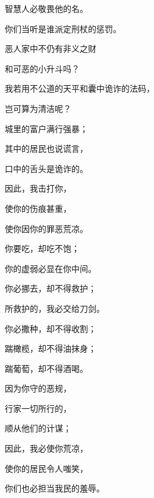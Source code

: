 {\par }{\Q 智慧人必敬畏他的名。
\par }{\Q 你们当听是谁派定刑杖的惩罚。
\par }{\Q {}恶人家中不仍有非义之财
\par }{\Q 和可恶的小升斗吗？
\par }{\Q {}我若用不公道的天平和囊中诡诈的法码，
\par }{\Q 岂可算为清洁呢？
\par }{\Q {}城里的富户满行强暴；
\par }{\Q 其中的居民也说谎言，
\par }{\Q 口中的舌头是诡诈的。
\par }{\Q {}因此，我击打你，
\par }{\Q 使你的伤痕甚重，
\par }{\Q 使你因你的罪恶荒凉。
\par }{\Q {}你要吃，却吃不饱；
\par }{\Q 你的虚弱必显在你中间。
\par }{\Q 你必挪去，却不得救护；
\par }{\Q 所救护的，我必交给刀剑。
\par }{\Q {}你必撒种，却不得收割；
\par }{\Q 踹橄榄，却不得油抹身；
\par }{\Q 踹葡萄，却不得酒喝。
\par }{\Q {}因为你守{}的恶规，
\par }{\Q 行{}家一切所行的，
\par }{\Q 顺从他们的计谋；
\par }{\Q 因此，我必使你荒凉，
\par }{\Q 使你的居民令人嗤笑，
\par }{\Q 你们也必担当我民的羞辱。

}
